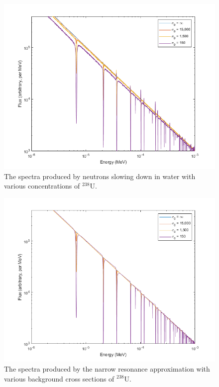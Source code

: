 \documentclass{article}
\begin{document}
\begin{figure}[h!]
	\centering
	\includegraphics[scale=0.6]{./images/dilution_238.png} 
	\caption{The spectra produced by neutrons slowing down in water with various concentrations of $^{238}$U.} 
	\label{fig:dilution}
\end{figure}

\begin{figure}[h!]
	\centering
	\includegraphics[scale=0.6]{./images/NR_238.png} 
	\caption{The spectra produced by the narrow resonance approximation with various background cross sections of $^{238}$U.} 
	\label{fig:NR}
\end{figure}
\end{document}
